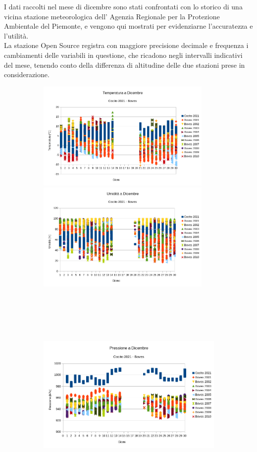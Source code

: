 \documentclass[12pt, a4paper]{article}
\begin{document}
	I dati raccolti nel mese di dicembre sono stati confrontati con lo storico di una vicina stazione meteorologica dell' Agenzia Regionale per la Protezione Ambientale del Piemonte, e vengono qui mostrati per evidenziarne l'accuratezza e l'utilità.\\
	La stazione Open Source registra con maggiore precisione decimale e frequenza i cambiamenti delle variabili in questione, che ricadono negli intervalli indicativi del mese, tenendo conto della differenza di altitudine delle due stazioni prese in considerazione.
	\begin{figure}
		\begin{subfigure}{\linewidth}
				\includegraphics[height=150pt]{graficiBoves/temperatura.png}
				\includegraphics[height=150pt]{graficiBoves/umidita.png}
				\caption{}
			   \end{subfigure}\par\medskip
		      \begin{subfigure}{\linewidth}
		      	\includegraphics[height=300pt]{graficiBoves/pressione.png}

\end{subfigure}
\end{figure}
\end{document}
